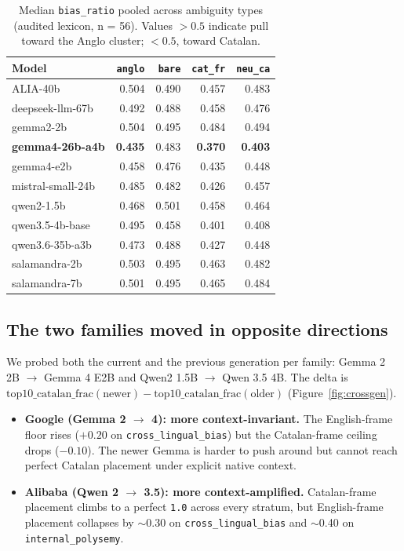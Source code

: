 \documentclass[10pt,twocolumn,a4paper]{article}
\newcommand{\code}[1]{\texttt{\small #1}}
\begin{document}
\begin{table}[t]
  \centering
  \small
  \setlength{\tabcolsep}{4pt}
  \begin{tabular}{@{}lrrrr@{}}
    \toprule
    \textbf{Model} & \code{anglo} & \code{bare} & \code{cat\_fr} & \code{neu\_ca} \\
    \midrule
    ALIA-40b          & 0.504 & 0.490 & 0.457 & 0.483 \\
    deepseek-llm-67b  & 0.492 & 0.488 & 0.458 & 0.476 \\
    gemma2-2b         & 0.504 & 0.495 & 0.484 & 0.494 \\
    \textbf{gemma4-26b-a4b} & \textbf{0.435} & 0.483 & \textbf{0.370} & \textbf{0.403} \\
    gemma4-e2b        & 0.458 & 0.476 & 0.435 & 0.448 \\
    mistral-small-24b & 0.485 & 0.482 & 0.426 & 0.457 \\
    qwen2-1.5b        & 0.468 & 0.501 & 0.458 & 0.464 \\
    qwen3.5-4b-base   & 0.495 & 0.458 & 0.401 & 0.408 \\
    qwen3.6-35b-a3b   & 0.473 & 0.488 & 0.427 & 0.448 \\
    salamandra-2b     & 0.503 & 0.495 & 0.463 & 0.482 \\
    salamandra-7b     & 0.501 & 0.495 & 0.465 & 0.484 \\
    \bottomrule
  \end{tabular}
  \caption{Median \code{bias\_ratio} pooled across ambiguity types (audited
  lexicon, n = 56). Values $>0.5$ indicate pull toward the Anglo cluster;
  $<0.5$, toward Catalan.}
  \label{tab:bias}
\end{table}

\subsection{The two families moved in opposite directions}

We probed both the current and the previous generation per family: Gemma 2 2B
$\rightarrow$ Gemma 4 E2B and Qwen2 1.5B $\rightarrow$ Qwen 3.5 4B. The delta
is $\text{top10\_catalan\_frac}(\text{newer}) -
\text{top10\_catalan\_frac}(\text{older})$ (Figure~\ref{fig:crossgen}).

\begin{itemize}[leftmargin=1.3em,itemsep=3pt,topsep=2pt]
  \item \textbf{Google (Gemma 2 $\rightarrow$ 4): more context-invariant.} The
        English-frame floor rises ($+0.20$ on \code{cross\_lingual\_bias}) but
        the Catalan-frame ceiling drops ($-0.10$). The newer Gemma is harder
        to push around but cannot reach perfect Catalan placement under
        explicit native context.
  \item \textbf{Alibaba (Qwen 2 $\rightarrow$ 3.5): more context-amplified.}
        Catalan-frame placement climbs to a perfect \code{1.0} across every
        stratum, but English-frame placement collapses by $\sim$0.30 on
        \code{cross\_lingual\_bias} and $\sim$0.40 on
        \code{internal\_polysemy}.
\end{itemize}
\end{document}
